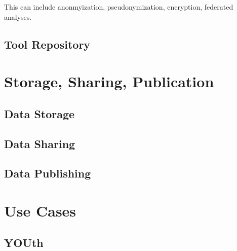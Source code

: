 \documentclass[
]{book}
\begin{document}
This can include anonmyization, pseudonymization, encryption, federated analyses.

\hypertarget{tool-repository}{%
\chapter*{Tool Repository}\label{tool-repository}}

\hypertarget{part-storage-sharing-publication}{%
\part{Storage, Sharing, Publication}\label{part-storage-sharing-publication}}

\hypertarget{data-storage}{%
\chapter*{Data Storage}\label{data-storage}}

\hypertarget{data-sharing}{%
\chapter*{Data Sharing}\label{data-sharing}}

\hypertarget{data-publishing}{%
\chapter*{Data Publishing}\label{data-publishing}}

\hypertarget{part-use-cases}{%
\part{Use Cases}\label{part-use-cases}}

\hypertarget{youth}{%
\chapter*{YOUth}\label{youth}}

  
\end{document}

